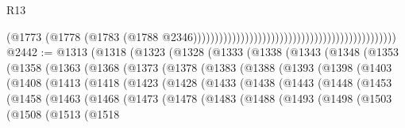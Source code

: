 \begin{lexlean}{R13}
\begin{coremodule}
{{{{{{{{{{{{{{{{{{{{{{{{{{{{{{{{{{{{{{{{{{{{{{{{{{{{{{{{{{{{{{{{{{{{{{{{{{{{{{{{{{{{{{{{{{{{{{{{{{{{{{{{{{                                                                                          (@1773
                                                                                            (@1778
                                                                                              (@1783
                                                                                                (@1788
                                                                                                  @2346)))))))))))))))))))))))))))))))))))))))))))))))
@2442 := @1313
    (@1318
      (@1323
        (@1328
          (@1333
            (@1338
              (@1343
                (@1348
                  (@1353
                    (@1358
                      (@1363
                        (@1368
                          (@1373
                            (@1378
                              (@1383
                                (@1388
                                  (@1393
                                    (@1398
                                      (@1403
                                        (@1408
                                          (@1413
                                            (@1418
                                              (@1423
                                                (@1428
                                                  (@1433
                                                    (@1438
                                                      (@1443
                                                        (@1448
                                                          (@1453
                                                            (@1458
                                                              (@1463
                                                                (@1468
                                                                  (@1473
                                                                    (@1478
                                                                      (@1483
                                                                        (@1488
                                                                          (@1493
                                                                            (@1498
                                                                              (@1503
                                                                                (@1508
                                                                                  (@1513
                                                                                    (@1518
}}}}}}}}}}}}}}}}}}}}}}}}}}}}}}}}}}}}}}}}}}}}}}}}}}}}}}}}}}}}}}}}}}}}}}}}}}}}}}}}}}}}}}}}}}}}}}}}}}}}}}}}}}
\end{coremodule}
\end{lexlean}
